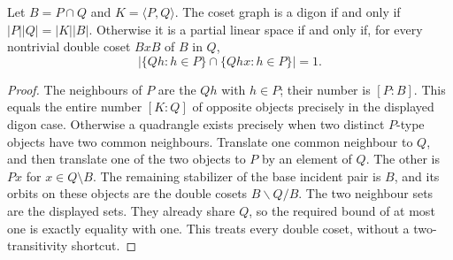 \documentclass[11pt]{article}
\begin{document}
\begin{lemma}
Let $B=P\cap Q$ and $K=\langle P,Q\rangle$. The coset graph is a digon
if and only if $|P||Q|=|K||B|$. Otherwise it is a partial linear space if
and only if, for every nontrivial double coset $BxB$ of $B$ in $Q$,
\[
 \left|\{Qh:h\in P\}\cap\{Qhx:h\in P\}\right|=1.
\]
\end{lemma}
\begin{proof}
The neighbours of $P$ are the $Qh$ with $h\in P$; their number is
$[P:B]$. This equals the entire number $[K:Q]$ of opposite objects
precisely in the displayed digon case. Otherwise a quadrangle exists
precisely when two distinct $P$-type objects have two common neighbours.
Translate one common neighbour to $Q$, and then translate one of the two
objects to $P$ by an element of $Q$. The other is $Px$ for $x\in Q\setminus B$.
The remaining stabilizer of the base incident pair is $B$, and its orbits
on these objects are the double cosets $B\backslash Q/B$. The two neighbour
sets are the displayed sets. They already share $Q$, so the required bound
of at most one is exactly equality with one. This treats every double
coset, without a two-transitivity shortcut.
\end{proof}
\end{document}
